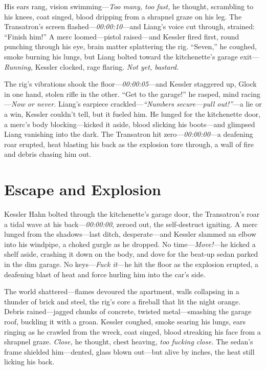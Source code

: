 \documentclass[12pt]{book}
\begin{document}
His ears rang, vision swimming—\textit{Too many, too fast,} he thought, scrambling to his knees, coat singed, blood dripping from a shrapnel graze on his leg. The Transatron’s screen flashed—\textit{00:00:10}—and Liang’s voice cut through, strained: “Finish him!” A merc loomed—pistol raised—and Kessler fired first, round punching through his eye, brain matter splattering the rig. “Seven,” he coughed, smoke burning his lungs, but Liang bolted toward the kitchenette’s garage exit—\textit{Running,} Kessler clocked, rage flaring. \textit{Not yet, bastard.}

The rig’s vibrations shook the floor—\textit{00:00:05}—and Kessler staggered up, Glock in one hand, stolen rifle in the other. “Get to the garage!” he rasped, mind racing—\textit{Now or never.} Liang’s earpiece crackled—\textit{“Numbers secure—pull out!”}—a lie or a win, Kessler couldn’t tell, but it fueled him. He lunged for the kitchenette door, a merc’s body blocking—kicked it aside, blood slicking his boots—and glimpsed Liang vanishing into the dark. The Transatron hit zero—\textit{00:00:00}—a deafening roar erupted, heat blasting his back as the explosion tore through, a wall of fire and debris chasing him out.

\section{Escape and Explosion}

Kessler Hahn bolted through the kitchenette’s garage door, the Transatron’s roar a tidal wave at his back—\textit{00:00:00}, zeroed out, the self-destruct igniting. A merc lunged from the shadows—last ditch, desperate—and Kessler slammed an elbow into his windpipe, a choked gurgle as he dropped. No time—\textit{Move!}—he kicked a shelf aside, crashing it down on the body, and dove for the beat-up sedan parked in the dim garage. No keys—\textit{Fuck it}—he hit the floor as the explosion erupted, a deafening blast of heat and force hurling him into the car’s side.

The world shattered—flames devoured the apartment, walls collapsing in a thunder of brick and steel, the rig’s core a fireball that lit the night orange. Debris rained—jagged chunks of concrete, twisted metal—smashing the garage roof, buckling it with a groan. Kessler coughed, smoke searing his lungs, ears ringing as he crawled from the wreck, coat singed, blood streaking his face from a shrapnel graze. \textit{Close,} he thought, chest heaving, \textit{too fucking close.} The sedan’s frame shielded him—dented, glass blown out—but alive by inches, the heat still licking his back.
\end{document}
